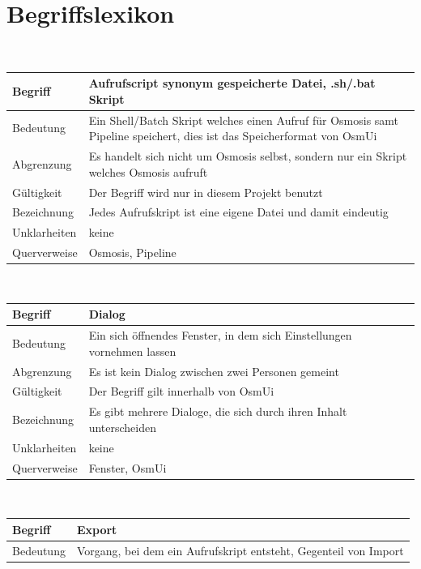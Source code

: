 \documentclass[a4paper,12pt]{scrartcl}
\begin{document}
\section{Begriffslexikon}
\begin{center}
\ \\
\begin{tabular}{|p{5cm}|p{10cm}|}
\hline Begriff & \textbf{Aufrufscript} synonym gespeicherte Datei, .sh/.bat Skript\\ 
\hline Bedeutung & Ein Shell/Batch Skript welches einen Aufruf für Osmosis samt Pipeline speichert,
\newline dies ist das Speicherformat von OsmUi \\ 
\hline Abgrenzung & Es handelt sich nicht um Osmosis selbst, sondern nur ein Skript welches Osmosis aufruft \\ 
\hline Gültigkeit &  Der Begriff wird nur in diesem Projekt benutzt\\ 
\hline Bezeichnung &  Jedes Aufrufskript ist eine eigene Datei und damit eindeutig\\ 
\hline Unklarheiten &  keine \\ 
\hline Querverweise &  Osmosis, Pipeline\\ 
\hline 
\end{tabular}
\vspace{0.7cm}
\\
\begin{tabular}{|p{5cm}|p{10cm}|}
\hline Begriff & \textbf{Dialog}\\ 
\hline Bedeutung & Ein sich öffnendes Fenster, in dem sich Einstellungen vornehmen lassen \\ 
\hline Abgrenzung & Es ist kein Dialog zwischen zwei Personen gemeint\\ 
\hline Gültigkeit & Der Begriff gilt innerhalb von OsmUi \\ 
\hline Bezeichnung & Es gibt mehrere Dialoge, die sich durch ihren Inhalt unterscheiden \\ 
\hline Unklarheiten & keine \\ 
\hline Querverweise & Fenster, OsmUi \\ 
\hline
\end{tabular}
\vspace{0.7cm}
\\
\begin{tabular}{|p{5cm}|p{10cm}|}
\hline Begriff & \textbf{Export}\\
\hline Bedeutung & Vorgang, bei dem ein Aufrufskript entsteht, Gegenteil von Import \\ 

\end{tabular}
\end{center}
\end{document}
